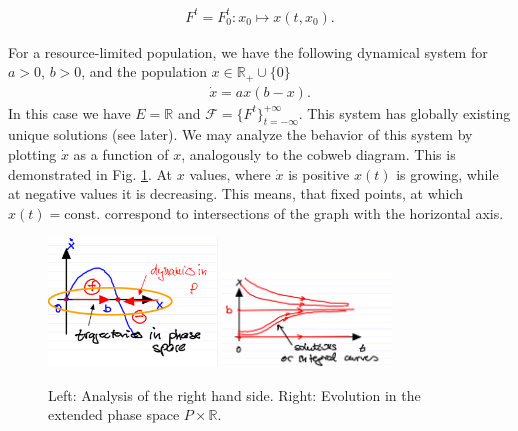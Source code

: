 \begin{align}
	\boxed{ F^{t} = F_{0}^{t}: x_0 \mapsto x(t,x_0).}
\end{align}
\begin{ex}
	For a resource-limited population, we have the following dynamical system for $a> 0$, $b> 0$, and the population $x\in \mathbb{R}_+ \cup \{0\}$
	\begin{align}
		\dot{x} = ax(b-x).
	\end{align}
	In this case we have $E=\mathbb{R}$ and $\mathcal{F} = \{F^{t}\}_{t=-\infty }^{+\infty }$. This system has globally existing unique solutions (see later).	We may analyze the behavior of this system by plotting $\dot{x}$ as a function of $x$, analogously to the cobweb diagram. This is demonstrated in Fig. \ref{fig:intro:3}. At $x$ values, where $\dot{x}$ is positive $x(t)$ is growing, while at negative values it is decreasing. This means, that fixed points, at which $x(t)=\text{const.}$ correspond to intersections of the graph with the horizontal axis. 
	\begin{figure}[H]
		\centering
		\includegraphics[width=0.4\textwidth]{figures/intro/3RHS.png}	
		\hspace{0.05\textwidth}
		\includegraphics[width=0.4\textwidth]{figures/intro/4solutions.png}
		\caption{Left: Analysis of the right hand side. Right: Evolution in the extended phase space $P \times \mathbb{R}$.}
		\label{fig:intro:3}
	\end{figure}

\end{ex}

